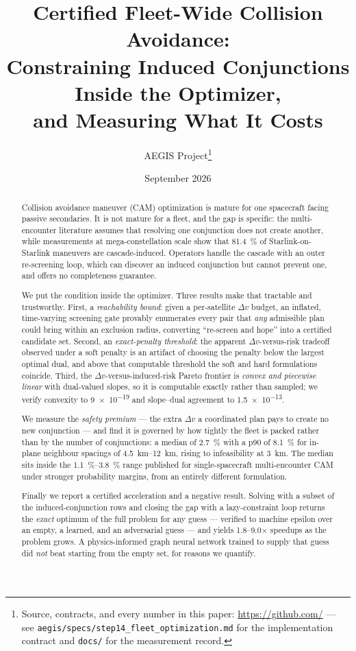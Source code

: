 \documentclass[11pt]{article}
\title{Certified Fleet-Wide Collision Avoidance:\\
Constraining Induced Conjunctions Inside the Optimizer,\\
and Measuring What It Costs}
\author{AEGIS Project\thanks{Source, contracts, and every number in this paper:
\url{https://github.com/} --- see \texttt{aegis/specs/step14\_fleet\_optimization.md}
for the implementation contract and \texttt{docs/} for the measurement record.}}
\date{September 2026}
\theoremstyle{definition}
\theoremstyle{remark}
\newcommand{\dv}{\Delta v}
\begin{document}
\maketitle

\begin{abstract}
Collision avoidance maneuver (CAM) optimization is mature for one spacecraft
facing passive secondaries. It is not mature for a fleet, and the gap is
specific: the multi-encounter literature assumes that resolving one conjunction
does not create another, while measurements at mega-constellation scale show
that \SI{81.4}{\percent} of Starlink-on-Starlink maneuvers are cascade-induced.
Operators handle the cascade with an outer re-screening loop, which can
discover an induced conjunction but cannot prevent one, and offers no
completeness guarantee.

We put the condition inside the optimizer. Three results make that tractable
and trustworthy. First, a \emph{reachability bound}: given a per-satellite
$\dv$ budget, an inflated, time-varying screening gate provably enumerates
every pair that \emph{any} admissible plan could bring within an exclusion
radius, converting ``re-screen and hope'' into a certified candidate set.
Second, an \emph{exact-penalty threshold}: the apparent $\dv$-versus-risk
tradeoff observed under a soft penalty is an artifact of choosing the penalty
below the largest optimal dual, and above that computable threshold the soft
and hard formulations coincide. Third, the $\dv$-versus-induced-risk Pareto
frontier is \emph{convex and piecewise linear} with dual-valued slopes, so it
is computable exactly rather than sampled; we verify convexity to
\num{9e-19} and slope--dual agreement to \num{1.5e-13}.

We measure the \emph{safety premium} --- the extra $\dv$ a coordinated plan
pays to create no new conjunction --- and find it is governed by how tightly
the fleet is packed rather than by the number of conjunctions: a median of
\SI{2.7}{\percent} with a p90 of \SI{8.1}{\percent} for in-plane neighbour
spacings of \SIrange{4.5}{12}{\kilo\meter}, rising to infeasibility at
\SI{3}{\kilo\meter}. The median sits inside the \SIrange{1.1}{3.8}{\percent}
range published for single-spacecraft multi-encounter CAM under stronger
probability margins, from an entirely different formulation.

Finally we report a certified acceleration and a negative result. Solving with
a subset of the induced-conjunction rows and closing the gap with a
lazy-constraint loop returns the \emph{exact} optimum of the full problem for
any guess --- verified to machine epsilon over an empty, a learned, and an
adversarial guess --- and yields \numrange{1.8}{9.0}$\times$ speedups as the
problem grows. A physics-informed graph neural network trained to supply that
guess did \emph{not} beat starting from the empty set, for reasons we quantify.
\end{abstract}
\end{document}
